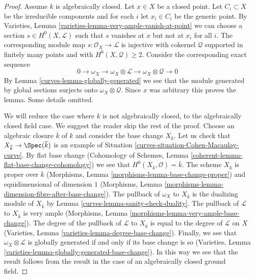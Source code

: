 \begin{proof}

Assume $k$ is algebraically closed. Let $x \in X$ be a closed point.
Let $C_i \subset X$ be the irreducible components and for each $i$
let $x_i \in C_i$ be the generic point. By
Varieties, Lemma \ref{varieties-lemma-very-ample-vanish-at-point}
we can choose a section $s \in H^0(X, \mathcal{L})$ such that $s$
vanishes at $x$ but not at $x_i$ for all $i$. The corresponding
module map $s : \mathcal{O}_X \to \mathcal{L}$ is injective with
cokernel $\mathcal{Q}$ supported in finitely many points and
with $H^0(X, \mathcal{Q}) \geq 2$. Consider the corresponding
exact sequence
$$
0 \to \omega_X \to \omega_X \otimes \mathcal{L} \to
\omega_X \otimes \mathcal{Q} \to 0
$$
By Lemma \ref{curves-lemma-globally-generated} we see that the module generated
by global sections surjects onto $\omega_X \otimes \mathcal{Q}$.
Since $x$ was arbitrary this proves the lemma. Some details omitted.

\medskip\noindent
We will reduce the case where $k$ is not algebraically closed, to
the algebraically closed field case. We suggest the reader skip
the rest of the proof. Choose an algebraic closure $\overline{k}$
of $k$ and consider the base change $X_{\overline{k}}$. Let us
check that $X_{\overline{k}} \to \Spec(\overline{k})$ is an example
of Situation \ref{curves-situation-Cohen-Macaulay-curve}. By flat base change
(Cohomology of Schemes, Lemma \ref{coherent-lemma-flat-base-change-cohomology})
we see that $H^0(X_{\overline{k}}, \mathcal{O}) = \overline{k}$.
The scheme $X_{\overline{k}}$ is proper over $\overline{k}$ (Morphisms,
Lemma \ref{morphisms-lemma-base-change-proper}) and
equidimensional of dimension $1$
(Morphisms, Lemma \ref{morphisms-lemma-dimension-fibre-after-base-change}).
The pullback of $\omega_X$ to $X_{\overline{k}}$ is the dualizing
module of $X_{\overline{k}}$ by Lemma \ref{curves-lemma-sanity-check-duality}.
The pullback of $\mathcal{L}$ to $X_{\overline{k}}$ is very ample
(Morphisms, Lemma \ref{morphisms-lemma-very-ample-base-change}).
The degree of the pullback of $\mathcal{L}$ to $X_{\overline{k}}$
is equal to the degree of $\mathcal{L}$ on $X$ (Varieties, Lemma
\ref{varieties-lemma-degree-base-change}). Finally, we see that
$\omega_X \otimes \mathcal{L}$ is globally generated if and only
if its base change is so
(Varieties, Lemma \ref{varieties-lemma-globally-generated-base-change}).
In this way we see that the result follows from the result in the
case of an algebraically closed ground field.
\end{proof}

